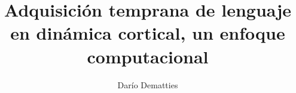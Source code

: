 \documentclass[a4paper,12pt,twoside]{report}
\begin{document}
\title{\LARGE {\bf Adquisición temprana de lenguaje en dinámica cortical, un enfoque computacional}\\
 \vspace*{6mm}
}

\author{Dar\'io Dematties}
\normallinespacing
\maketitle


\preface

%
%
%

\body








\appendix




\end{document}
